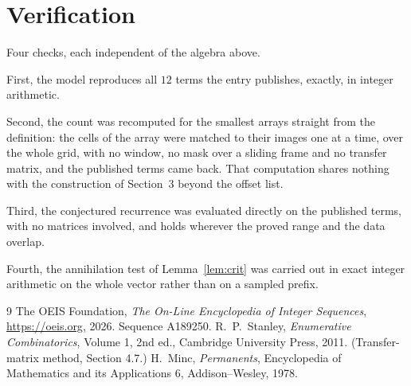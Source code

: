 \documentclass[11pt,a4paper]{article}
\theoremstyle{plain}
\theoremstyle{definition}
\begin{document}
\section{Verification}

Four checks, each independent of the algebra above.

First, the model reproduces all $12$ terms the entry publishes, exactly, in integer
arithmetic.

Second, the count was recomputed for the smallest arrays straight from the definition: the
cells of the array were matched to their images one at a time, over the whole grid, with no
window, no mask over a sliding frame and no transfer matrix, and the published terms came back.
That computation shares nothing with the construction of Section~3 beyond the offset list.

Third, the conjectured recurrence was evaluated directly on the published terms, with no
matrices involved, and holds wherever the proved range and the data overlap.

Fourth, the annihilation test of Lemma~\ref{lem:crit} was carried out in exact integer
arithmetic on the whole vector rather than on a sampled prefix.

\begin{thebibliography}{9}
 The OEIS Foundation, \emph{The On-Line Encyclopedia of Integer
Sequences}, \url{https://oeis.org}, 2026. Sequence A189250.
 R.~P.~Stanley, \emph{Enumerative Combinatorics}, Volume 1, 2nd ed.,
Cambridge University Press, 2011. (Transfer-matrix method, Section 4.7.)
 H.~Minc, \emph{Permanents}, Encyclopedia of Mathematics and its
Applications 6, Addison--Wesley, 1978.
\end{thebibliography}
\end{document}
